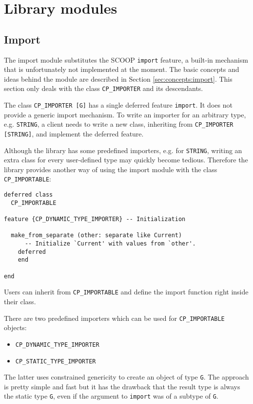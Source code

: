 \section{Library modules}
\label{sec:modules}

\subsection{Import}
\label{sec:modules:import}

The import module substitutes the SCOOP \lstinline!import! feature, a built-in mechanism that is unfortunately not implemented at the moment.
The basic concepts and ideas behind the module are described in Section \ref{sec:concepts:import}.
This section only deals with the class \lstinline!CP_IMPORTER! and its descendants.

The class \lstinline!CP_IMPORTER [G]! has a single deferred feature \lstinline!import!.
It does not provide a generic import mechanism.
To write an importer for an arbitrary type, e.g. \lstinline!STRING!, a client needs to write a new class, inheriting from \lstinline!CP_IMPORTER [STRING]!, and implement the deferred feature.

Although the library has some predefined importers, e.g. for \lstinline!STRING!, writing an extra class for every user-defined type may quickly become tedious.
Therefore the library provides another way of using the import module with the class \lstinline!CP_IMPORTABLE!:

\begin{lstlisting}[captionpos=b, caption={The deferred class CP\_IMPORTABLE.}]
deferred class
  CP_IMPORTABLE

feature {CP_DYNAMIC_TYPE_IMPORTER} -- Initialization

  make_from_separate (other: separate like Current)
      -- Initialize `Current' with values from `other'.
    deferred
    end

end
\end{lstlisting}

Users can inherit from \lstinline!CP_IMPORTABLE! and define the import function right inside their class.

There are two predefined importers which can be used for \lstinline!CP_IMPORTABLE! objects: 
\begin{itemize}
 \item \lstinline!CP_DYNAMIC_TYPE_IMPORTER!
 \item \lstinline!CP_STATIC_TYPE_IMPORTER!
\end{itemize}
The latter uses constrained genericity to create an object of type \lstinline!G!.
The approach is pretty simple and fast but it has the drawback that the result type is always the static type \lstinline!G!, even if the argument to \lstinline!import! was of a subtype of \lstinline!G!.

